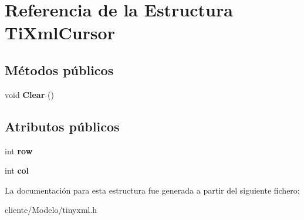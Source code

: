 \hypertarget{structTiXmlCursor}{\section{\-Referencia de la \-Estructura \-Ti\-Xml\-Cursor}
\label{structTiXmlCursor}
}
\subsection*{\-Métodos públicos}
\begin{DoxyCompactItemize}
\item 
\hypertarget{structTiXmlCursor_a1e6fa622b59dafb71b6efe595105dcdd}{void {\bfseries \-Clear} ()}\label{structTiXmlCursor_a1e6fa622b59dafb71b6efe595105dcdd}

\end{DoxyCompactItemize}
\subsection*{\-Atributos públicos}
\begin{DoxyCompactItemize}
\item 
\hypertarget{structTiXmlCursor_a5b54dd949820c2db061e2be41f3effb3}{int {\bfseries row}}\label{structTiXmlCursor_a5b54dd949820c2db061e2be41f3effb3}

\item 
\hypertarget{structTiXmlCursor_a5694d7ed2c4d20109d350c14c417969d}{int {\bfseries col}}\label{structTiXmlCursor_a5694d7ed2c4d20109d350c14c417969d}

\end{DoxyCompactItemize}


\-La documentación para esta estructura fue generada a partir del siguiente fichero\-:\begin{DoxyCompactItemize}
\item 
cliente/\-Modelo/tinyxml.\-h\end{DoxyCompactItemize}
